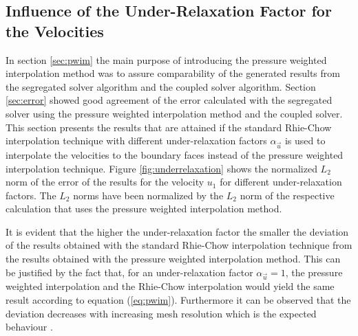 \subsection{Influence of the Under-Relaxation Factor for the Velocities}
\label{sec:independence}

In section \ref{sec:pwim} the main purpose of introducing the pressure weighted interpolation method was to assure comparability of the generated results from the segregated solver algorithm and the coupled solver algorithm. Section \ref{sec:error} showed good agreement of the error calculated with the segregated solver using the pressure weighted interpolation method and the coupled solver. This section presents the results that are attained if the standard Rhie-Chow interpolation technique with different under-relaxation factors \(\alpha_\vec{u}\) is used to interpolate the velocities to the boundary faces instead of the pressure weighted interpolation technique. Figure \ref{fig:underrelaxation} shows the normalized \(L_2\) norm of the error of the results for the velocity \(u_1\) for different under-relaxation factors. The \(L_2\) norms have been normalized by the \(L_2\) norm of the respective calculation that uses the pressure weighted interpolation method. 

It is evident that the higher the under-relaxation factor the smaller the deviation of the results obtained with the standard Rhie-Chow interpolation technique from the results obtained with the pressure weighted interpolation method. This can be justified by the fact that, for an under-relaxation factor \(\alpha_\vec{u} = 1\), the pressure weighted interpolation and the Rhie-Chow interpolation would yield the same result according to equation (\ref{eq:pwim}). Furthermore it can be observed that the deviation decreases with increasing mesh resolution which is the expected behaviour \cite{ferziger02}.

